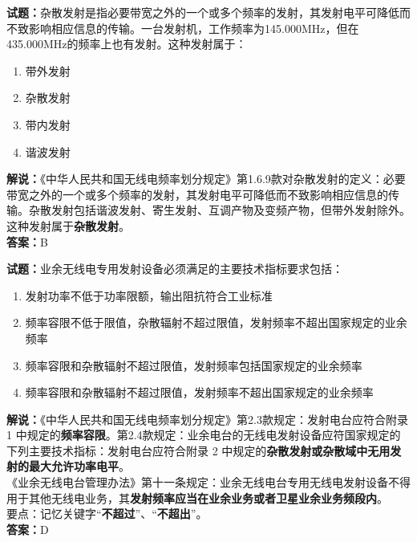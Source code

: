 \documentclass{ctexbook}
\begin{document}
\vspace{\baselineskip}

\noindent\textbf{试题：}杂散发射是指必要带宽之外的一个或多个频率的发射，其发射电平可降低而不致影响相应信息的传输。一台发射机，工作频率为145.000\unit{\MHz}，但在435.000\unit{\MHz}的频率上也有发射。这种发射属于：
\begin{enumerate}[leftmargin=3em]
  \item 带外发射
  \item 杂散发射
  \item 带内发射
  \item 谐波发射
\end{enumerate}
\noindent\textbf{解说：}《中华人民共和国无线电频率划分规定》第1.6.9款对杂散发射的定义：必要带宽之外的一个或多个频率的发射，其发射电平可降低而不致影响相应信息的传
输。杂散发射包括谐波发射、寄生发射、互调产物及变频产物，但带外发射除外。\\这种发射属于\textbf{杂散发射}。\\\noindent\textbf{答案：}B

\vspace{\baselineskip}

\noindent\textbf{试题：}业余无线电专用发射设备必须满足的主要技术指标要求包括：
\begin{enumerate}[leftmargin=3em]
  \item 发射功率不低于功率限额，输出阻抗符合工业标准
  \item 频率容限不低于限值，杂散辐射不超过限值，发射频率不超出国家规定的业余频率
  \item 频率容限和杂散辐射不超过限值，发射频率包括国家规定的业余频率
  \item 频率容限和杂散辐射不超过限值，发射频率不超出国家规定的业余频率
\end{enumerate}
\noindent\textbf{解说：}《中华人民共和国无线电频率划分规定》第2.3款规定：发射电台应符合附录 1 中规定的\textbf{频率容限}。第2.4款规定：业余电台的无线电发射设备应符国家规定的下列主要技术指标：发射电台应符合附录 2 中规定的\textbf{杂散发射或杂散域中无用发射的最大允许功率电平}。\\《业余无线电台管理办法》第十一条规定：业余无线电台专用无线电发射设备不得用于其他无线电业务，其\textbf{发射频率应当在业余业务或者卫星业余业务频段内}。\\要点：记忆关键字“\textbf{不超过}”、“\textbf{不超出}”。\\\noindent\textbf{答案：}D

\vspace{\baselineskip}
\end{document}
